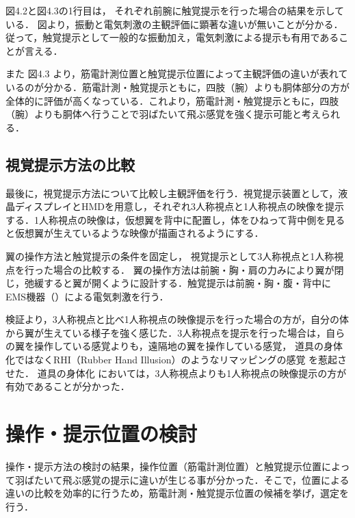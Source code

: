         図4.2と図4.3の1行目は，
        それぞれ前腕に触覚提示を行った場合の結果を示している．
        図より，振動と電気刺激の主観評価に顕著な違いが無いことが分かる．従って，触覚提示として一般的な振動加え，電気刺激による提示も有用であることが言える．

        また
        図4.3
        より，筋電計測位置と触覚提示位置によって主観評価の違いが表れているのが分かる．筋電計測・触覚提示ともに，四肢（腕）よりも胴体部分の方が全体的に評価が高くなっている．これより，筋電計測・触覚提示ともに，四肢（腕）よりも胴体へ行うことで羽ばたいて飛ぶ感覚を強く提示可能と考えられる．
        

    \subsection{視覚提示方法の比較}
        最後に，視覚提示方法について比較し主観評価を行う．視覚提示装置として，液晶ディスプレイとHMDを用意し，それぞれ3人称視点と1人称視点の映像を提示する．1人称視点の映像は，仮想翼を背中に配置し，体をひねって背中側を見ると仮想翼が生えているような映像が描画されるようにする．

        翼の操作方法と触覚提示の条件を固定し，
        視覚提示として3人称視点と1人称視点を行った場合の比較する．
        翼の操作方法は前腕・胸・肩の力みにより翼が閉じ，弛緩すると翼が開くように設計する．触覚提示は前腕・胸・腹・背中にEMS機器（）による電気刺激を行う．

        検証より，3人称視点と比べ1人称視点の映像提示を行った場合の方が，自分の体から翼が生えている様子を強く感じた．3人称視点を提示を行った場合は，自らの翼を操作している感覚よりも，遠隔地の翼を操作している感覚，
        道具の身体化ではなくRHI（Rubber Hand Illusion）のようなリマッピングの感覚
        を惹起させた．
        道具の身体化
        においては，3人称視点よりも1人称視点の映像提示の方が有効であることが分かった．
    
\section{操作・提示位置の検討}
    操作・提示方法の検討の結果，操作位置（筋電計測位置）と触覚提示位置によって羽ばたいて飛ぶ感覚の提示に違いが生じる事が分かった．そこで，位置による違いの比較を効率的に行うため，筋電計測・触覚提示位置の候補を挙げ，選定を行う．
    
